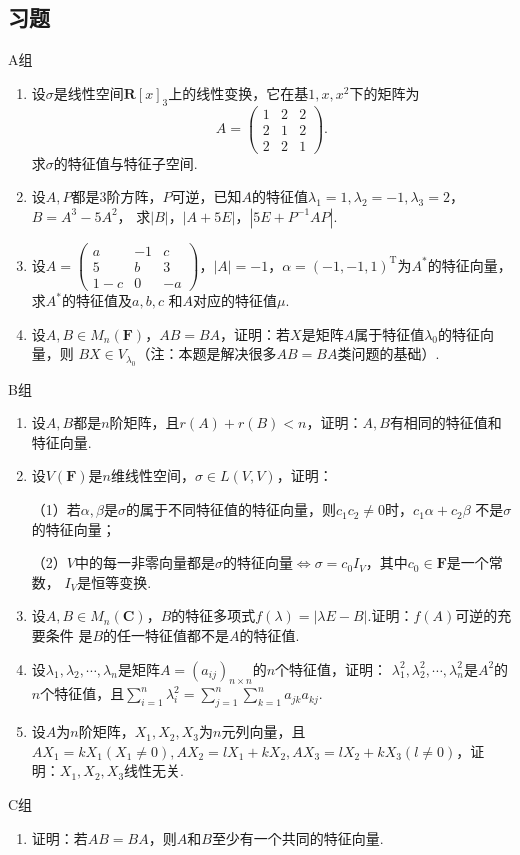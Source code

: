 \subsection{习题}
\centerline{\heiti A组}
\begin{enumerate}
	\item 设$\sigma$是线性空间$\mathbf{R}[x]_3$上的线性变换，它在基$1,x,x^2$下的矩阵为
	$$A=\begin{pmatrix}
		1 & 2 & 2 \\ 2 & 1 & 2 \\ 2 & 2 & 1
	\end{pmatrix}.$$
	求$\sigma$的特征值与特征子空间.
	\item 设$A,P$都是3阶方阵，$P$可逆，已知$A$的特征值$\lambda_1=1,\lambda_2=-1,\lambda_3=2$，$B=A^3-5A^2$，
	求$|B|$，$|A+5E|$，$|5E+P^{-1}AP|$.
	\item 设$A=\begin{pmatrix}
		a & -1 & c \\ 5 & b & 3 \\ 1-c & 0 & -a
	\end{pmatrix}$，$|A|=-1$，$\alpha=(-1,-1,1)^\mathrm{T}$为$A^*$的特征向量，求$A^*$的特征值及$a,b,c$
	和$A$对应的特征值$\mu$.
	\item 设$A,B\in M_n(\mathbf{F})$，$AB=BA$，证明：若$X$是矩阵$A$属于特征值$\lambda_0$的特征向量，则
	$BX\in V_{\lambda_0}$（注：本题是解决很多$AB=BA$类问题的基础）.
\end{enumerate}
\centerline{\heiti B组}
\begin{enumerate}
	\item 设$A,B$都是$n$阶矩阵，且$r(A)+r(B)<n$，证明：$A,B$有相同的特征值和特征向量.
	\item 设$V(\mathbf{F})$是$n$维线性空间，$\sigma\in L(V,V)$，证明：
	
	（1）若$\alpha,\beta$是$\sigma$的属于不同特征值的特征向量，则$c_1c_2\neq 0$时，$c_1\alpha+c_2\beta$
	不是$\sigma$的特征向量；

	（2）$V$中的每一非零向量都是$\sigma$的特征向量$\iff\sigma=c_0I_V$，其中$c_0\in\mathbf{F}$是一个常数，
	$I_V$是恒等变换.
	\item 设$A,B\in M_n(\mathbf{C})$，$B$的特征多项式$f(\lambda)=|\lambda E-B|$.证明：$f(A)$可逆的充要条件
	是$B$的任一特征值都不是$A$的特征值.
	\item 设$\lambda_1,\lambda_2,\cdots,\lambda_n$是矩阵$A=(a_{ij})_{n\times n}$的$n$个特征值，证明：
	$\lambda_1^2,\lambda_2^2,\cdots,\lambda_n^2$是$A^2$的$n$个特征值，且$\sum\limits_{i=1}^{n}\lambda_i^2=
	\sum\limits_{j=1}^{n}\sum\limits_{k=1}^{n}a_{jk}a_{kj}$.
	\item 设$A$为$n$阶矩阵，$X_1,X_2,X_3$为$n$元列向量，且$AX_1=kX_1(X_1\neq 0),AX_2=lX_1+kX_2,
	AX_3=lX_2+kX_3(l\neq 0)$，证明：$X_1,X_2,X_3$线性无关.
\end{enumerate}
\centerline{\heiti C组}
\begin{enumerate}
	\item 证明：若$AB=BA$，则$A$和$B$至少有一个共同的特征向量.
\end{enumerate}

